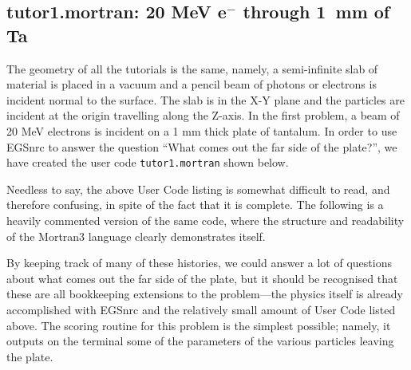 \vspace*{-5mm}
\subsection{tutor1.mortran: 20 MeV e$^-$ through 1~mm of Ta}
\vspace*{-3mm}
The geometry of all the tutorials is the same,  namely, a
semi-infinite slab of material is placed in a vacuum and a pencil beam
of photons or electrons is incident normal to the surface.  The slab
is in the X-Y plane and the particles are incident at the origin
travelling along the Z-axis.  In the first problem, a beam of 20 MeV
electrons is incident on a 1 mm thick plate of tantalum.  In order to
use EGSnrc to answer the question ``What comes out the far side of the
plate?'', we have created the user code {\tt tutor1.mortran} shown below.

\begin{latexonly}
%

\end{latexonly}
\begin{htmlonly}
\clearpage

\clearpage
\end{htmlonly}

Needless to say, the above User Code listing is
somewhat difficult to read, and therefore confusing, in
spite of the fact that it is complete.  The following is
a heavily commented version of the same code, where the structure and
readability of the Mortran3 language clearly demonstrates itself.

\newpage
\begin{latexonly}
%

\clearpage
%

\clearpage
\end{latexonly}

\begin{htmlonly}
\clearpage
%

\clearpage
%

\clearpage
\end{htmlonly}

By keeping track of many of these histories, we could answer a lot of
questions about what comes out the far side of the plate, but it
should be recognised that these are all bookkeeping extensions to the
problem---the physics itself is already accomplished with EGSnrc and the
relatively small amount of User Code listed above.  The scoring
routine for this problem is the simplest possible; namely, it outputs
on the terminal some of the parameters of the various particles
leaving the plate.

